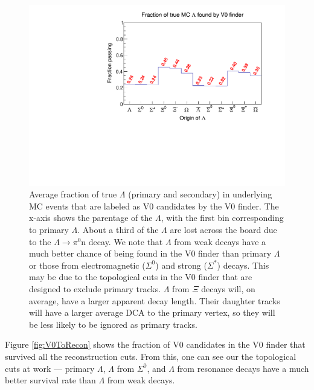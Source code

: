 \begin{figure}[hbt]
\includegraphics[width=36pc]{Figures/YieldAndEff/2016-08-10-FractionBeginToV0Finder.pdf}
\caption[V0 finder efficiency]{
Average fraction of true $\Lambda$ (primary and secondary) in underlying MC events that are labeled as V0 candidates by the V0 finder.
The x-axis shows the parentage of the $\Lambda$, with the first bin corresponding to primary $\Lambda$.
About a third of the $\Lambda$ are lost across the board due to the $\Lambda \rightarrow \pi^0 \mathrm{n}$ decay.
We note that $\Lambda$ from weak decays have a much better chance of being found in the V0 finder than primary $\Lambda$ or those from electromagnetic ($\Sigma^0$) and strong ($\Sigma^*$) decays.
This may be due to the topological cuts in the V0 finder that are designed to exclude primary tracks.
$\Lambda$ from $\Xi$ decays will, on average, have a larger apparent decay length.
Their daughter tracks will have a larger average DCA to the primary vertex, so they will be less likely to be ignored as primary tracks.
}
\label{fig:BeginToV0}
\end{figure}


Figure \ref{fig:V0ToRecon} shows the fraction of V0 candidates in the V0 finder that survived all the reconstruction cuts.  
From this, one can see our the topological cuts at work --- primary $\Lambda$, $\Lambda$ from $\Sigma^0$, and $\Lambda$ from resonance decays have a much better survival rate than $\Lambda$ from weak decays.



